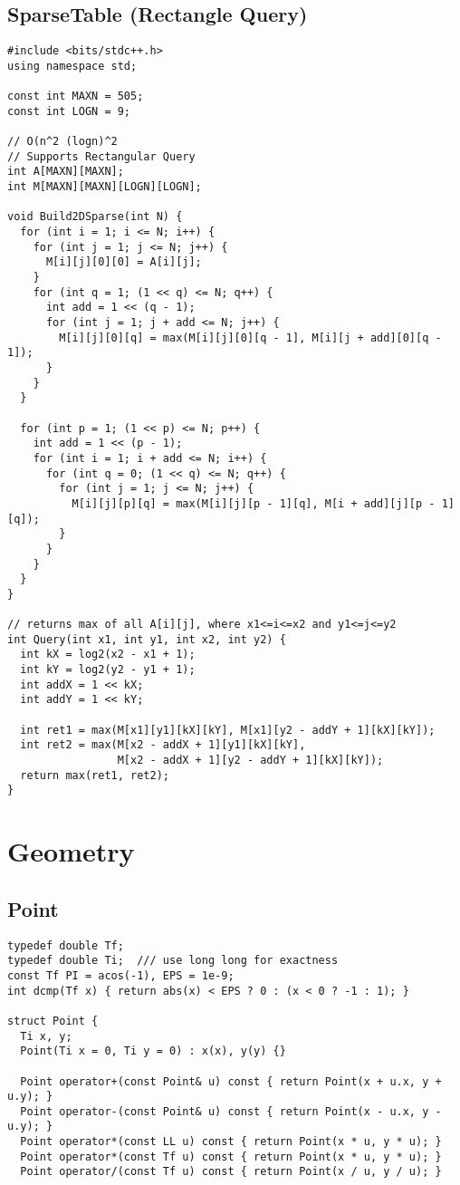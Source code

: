 \documentclass[FSZ,a4paper,onesided]{article}
\begin{document}
\begin{multicols*}{\COLS}
\subsection{SparseTable (Rectangle Query)}
\begin{lstlisting}
#include <bits/stdc++.h>
using namespace std;

const int MAXN = 505;
const int LOGN = 9;

// O(n^2 (logn)^2
// Supports Rectangular Query
int A[MAXN][MAXN];
int M[MAXN][MAXN][LOGN][LOGN];

void Build2DSparse(int N) {
  for (int i = 1; i <= N; i++) {
    for (int j = 1; j <= N; j++) {
      M[i][j][0][0] = A[i][j];
    }
    for (int q = 1; (1 << q) <= N; q++) {
      int add = 1 << (q - 1);
      for (int j = 1; j + add <= N; j++) {
        M[i][j][0][q] = max(M[i][j][0][q - 1], M[i][j + add][0][q - 1]);
      }
    }
  }

  for (int p = 1; (1 << p) <= N; p++) {
    int add = 1 << (p - 1);
    for (int i = 1; i + add <= N; i++) {
      for (int q = 0; (1 << q) <= N; q++) {
        for (int j = 1; j <= N; j++) {
          M[i][j][p][q] = max(M[i][j][p - 1][q], M[i + add][j][p - 1][q]);
        }
      }
    }
  }
}

// returns max of all A[i][j], where x1<=i<=x2 and y1<=j<=y2
int Query(int x1, int y1, int x2, int y2) {
  int kX = log2(x2 - x1 + 1);
  int kY = log2(y2 - y1 + 1);
  int addX = 1 << kX;
  int addY = 1 << kY;

  int ret1 = max(M[x1][y1][kX][kY], M[x1][y2 - addY + 1][kX][kY]);
  int ret2 = max(M[x2 - addX + 1][y1][kX][kY],
                 M[x2 - addX + 1][y2 - addY + 1][kX][kY]);
  return max(ret1, ret2);
}
\end{lstlisting}
\section{Geometry}
\subsection{Point}
\begin{lstlisting}
typedef double Tf;
typedef double Ti;  /// use long long for exactness
const Tf PI = acos(-1), EPS = 1e-9;
int dcmp(Tf x) { return abs(x) < EPS ? 0 : (x < 0 ? -1 : 1); }

struct Point {
  Ti x, y;
  Point(Ti x = 0, Ti y = 0) : x(x), y(y) {}

  Point operator+(const Point& u) const { return Point(x + u.x, y + u.y); }
  Point operator-(const Point& u) const { return Point(x - u.x, y - u.y); }
  Point operator*(const LL u) const { return Point(x * u, y * u); }
  Point operator*(const Tf u) const { return Point(x * u, y * u); }
  Point operator/(const Tf u) const { return Point(x / u, y / u); }


\end{lstlisting}
\end{multicols*}
\end{document}
